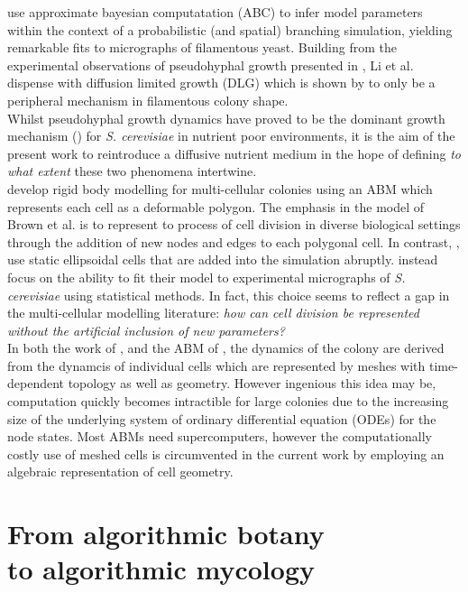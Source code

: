  \cite{li2024off} use approximate bayesian computatation (ABC)
 to infer model parameters within the context of a probabilistic (and spatial) branching simulation, 
 yielding remarkable fits to micrographs of filamentous yeast. Building 
 from the experimental observations of pseudohyphal growth presented in 
 \cite{gimeno1992unipolar}, Li et al. dispense with diffusion limited growth (DLG) which is
shown by \cite{tronnolone2018diffusion} to only be a peripheral mechanism in filamentous 
colony shape.
\\

Whilst pseudohyphal growth dynamics
have proved to be the dominant growth mechanism (\cite{tronnolone2018diffusion}) for 
\textit{S. cerevisiae} in nutrient poor environments, it is the aim of the present 
work to reintroduce a diffusive nutrient medium in the hope of defining 
\textit{to what extent} these two phenomena intertwine.
\\

\cite{brown2021rigid} develop rigid body modelling for multi-cellular colonies using 
an ABM which represents each cell as a deformable polygon. The emphasis in the model 
of Brown et al. is to represent to process of cell division in diverse biological 
settings through the addition of new nodes and edges to each polygonal cell. 
In contrast, \cite{li2024off}, use static ellipsoidal cells that are added into the simulation
abruptly. \cite{li2024off} instead focus on the ability to fit their model 
to experimental micrographs of \textit{S. cerevisiae} using statistical methods.
In fact, this choice seems to reflect a gap in the multi-cellular modelling literature:
\textit{how can cell division be represented without the artificial inclusion of new parameters?}
\\

In both the work of \cite{van2020quantitative}, and the ABM of 
\cite{brown2021rigid}, the dynamics of the colony 
are derived from the dynamcis of individual cells which are represented
by meshes with time-dependent topology as well as geometry. However ingenious this idea may be, 
computation quickly becomes intractible for large colonies
due to the increasing size of the underlying system of ordinary differential equation (ODEs)
for the node states. Most ABMs need supercomputers, however
the computationally costly use of meshed cells is circumvented in the current work by employing 
an algebraic representation of cell geometry.
\\

\section{From algorithmic botany \\ 
         to algorithmic mycology}

